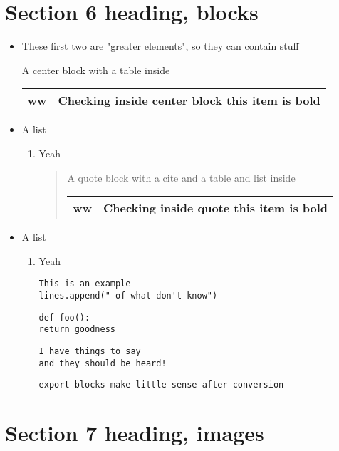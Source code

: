 \documentclass[11pt]{article}
\begin{document}
\section{Section 6 heading, blocks  }
 \label{obj-317}
 \label{obj-316}
\begin{itemize}
\item
These first two are "greater elements", so they can contain stuff
\begin{center}
A center block with a table inside

\begin{tabular}{|c|c|}
\hline
 ww  & Checking inside center block \textbf{this item is bold} \\
\hline
\end{tabular}
\end{center}
\item
A list
\begin{enumerate}
\item
Yeah

\begin{quote}
A quote block with a cite and  a table and list inside

 \label{obj-341}
\begin{tabular}{|c|c|}
\hline
 ww  & Checking inside quote \textbf{this item is bold} \\
\hline
\end{tabular}
\end{quote}
\end{enumerate}
\item
A list
\begin{enumerate}
\item
Yeah

\begin{verbatim}
This is an example
lines.append(" of what don't know")
\end{verbatim}
\begin{verbatim}
def foo():
return goodness
\end{verbatim}
\begin{verbatim}
I have things to say
and they should be heard!
\end{verbatim}
\begin{verbatim}
export blocks make little sense after conversion 
\end{verbatim}
\vspace{\baselineskip}
\end{enumerate}
\end{itemize}
\section{Section 7 heading, images  }
 \label{obj-360}
 \label{obj-359}
\end{document}

